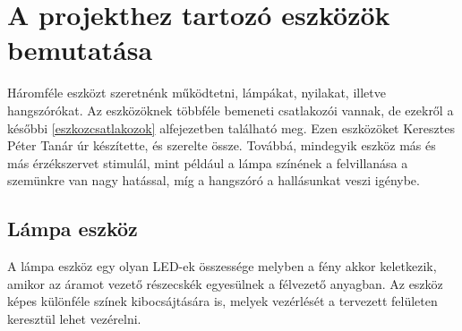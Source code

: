 \documentclass[tocnopagenum]{thesis-ekf}
\theoremstyle{definition}
\theoremstyle{remark}
\begin{document}
	\section{A projekthez tartozó eszközök bemutatása}
	Háromféle eszközt szeretnénk működtetni, lámpákat, nyilakat, illetve hangszórókat. Az eszközöknek többféle bemeneti csatlakozói vannak, de ezekről a későbbi  \ref{eszkozcsatlakozok} alfejezetben található meg.
	Ezen eszközöket Keresztes Péter Tanár úr készítette, és szerelte össze.
	Továbbá, mindegyik eszköz más és más érzékszervet stimulál, mint például a lámpa színének a felvillanása a szemünkre van nagy hatással, míg a hangszóró a hallásunkat veszi igénybe. 
	\subsection{Lámpa eszköz}
	A lámpa eszköz egy olyan LED-ek összessége melyben a fény akkor keletkezik, amikor az áramot vezető részecskék egyesülnek a félvezető anyagban. Az eszköz képes különféle színek kibocsájtására is, melyek vezérlését a tervezett felületen keresztül lehet vezérelni.
\end{document}
